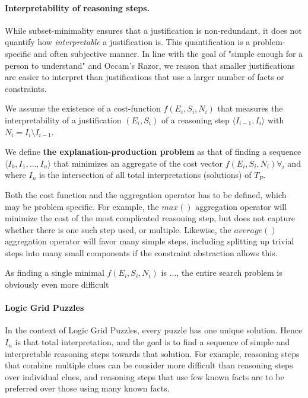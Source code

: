 \paragraph{Interpretability of reasoning steps.}
While subset-minimality ensures that a justification is non-redundant, it does not quantify how \textit{interpretable} a justification is. 
This quantification is a problem-specific and often subjective manner. In line with the goal of "simple enough for a person to understand" and Occam's Razor, we reason that smaller justifications are easier to interpret than justifications that use a larger number of facts or constraints. %

We assume the existence of a cost-function $f(E_i,S_i,N_i)$ that measures the interpretability of a justification $(E_i,S_i)$ of a reasoning step $\langle I_{i-1}, I_i \rangle$ with $N_i = I_i \setminus I_{i-1}$.

We define \textbf{the explanation-production problem} as that of finding a sequence $\langle I_0, I_1, \ldots, I_n \rangle$ that minimizes an aggregate of the cost vector $f(E_i,S_i,N_i) \forall_i$ and where $I_n$ is the intersection of all total interpretations (solutions) of $T_P$. 

Both the cost function and the aggregation operator has to be defined, which may be problem specific. For example, the $max()$ aggregation operator will minimize the cost of the most complicated reasoning step, but does not capture whether there is one such step used, or multiple. Likewise, the $average()$ aggregation operator will favor many simple steps, including splitting up trivial steps into many small components if the constraint abstraction allows this.

As finding a single minimal $f(E_i,S_i,N_i)$ is ..., the entire search problem is obviously even more difficult 


\paragraph{Logic Grid Puzzles} In the context of Logic Grid Puzzles, every puzzle has one unique solution. Hence $I_n$ is that total interpretation, and the goal is to find a sequence of simple and interpretable reasoning steps towards that solution. For example, reasoning steps that combine multiple clues can be consider more difficult than reasoning steps over individual clues, and reasoning steps that use few known facts are to be preferred over those using many known facts.

